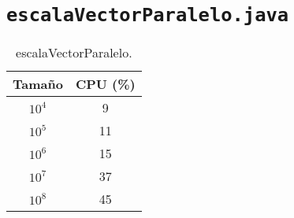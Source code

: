 \documentclass[12pt,letterpaper]{article}
\begin{document}
\section{\texttt{escalaVectorParalelo.java}}
\begin{center}
	\begin{table}[htbp]
		\begin{center}
			\begin{tabular}{|c|c|}
				\hline
				\textbf{Tamaño} & \textbf{CPU (\%)}  \\
				\hline 
				$10^4$ & 9 \\ \hline
				$10^5$ & 11 \\ \hline
				$10^6$ & 15 \\ \hline	
				$10^7$ & 37 \\ \hline
				$10^8$ & 45 \\ \hline
			\end{tabular}
			\caption{escalaVectorParalelo.}
			\label{tabla:escalaVectorParalelo}
		\end{center}
	\end{table}
\end{center}
\end{document}
